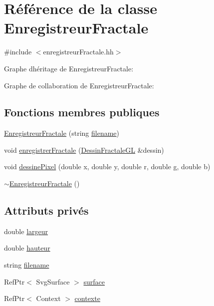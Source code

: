 \hypertarget{classEnregistreurFractale}{}\section{Référence de la classe Enregistreur\+Fractale}
\label{classEnregistreurFractale}


{\ttfamily \#include $<$enregistreur\+Fractale.\+hh$>$}



Graphe d\textquotesingle{}héritage de Enregistreur\+Fractale\+:


Graphe de collaboration de Enregistreur\+Fractale\+:
\subsection*{Fonctions membres publiques}
\begin{DoxyCompactItemize}
\item 
\hyperlink{classEnregistreurFractale_a41e2b5d991a102bf7af1491b986ab8fb}{Enregistreur\+Fractale} (string \hyperlink{classEnregistreurFractale_a31b4ca6d0309700e2e6c26087a76d855}{filename})
\item 
void \hyperlink{classEnregistreurFractale_aa6ad605b775a79d8ea96a5bc8008070a}{enregistrer\+Fractale} (\hyperlink{classDessinFractaleGL}{Dessin\+Fractale\+GL} \&dessin)
\item 
void \hyperlink{classEnregistreurFractale_a594fe98fad6fe07acee198fb5de013ab}{dessine\+Pixel} (double x, double y, double r, double g, double b)
\item 
\hyperlink{classEnregistreurFractale_a5cb00738a4526c7bf1c93a84077cdb42}{$\sim$\+Enregistreur\+Fractale} ()
\end{DoxyCompactItemize}
\subsection*{Attributs privés}
\begin{DoxyCompactItemize}
\item 
double \hyperlink{classEnregistreurFractale_abbaf005fa703ee05a79abca7006f3a5e}{largeur}
\item 
double \hyperlink{classEnregistreurFractale_aa7b368324a887410f6133edfd370fe5c}{hauteur}
\item 
string \hyperlink{classEnregistreurFractale_a31b4ca6d0309700e2e6c26087a76d855}{filename}
\item 
Ref\+Ptr$<$ Svg\+Surface $>$ \hyperlink{classEnregistreurFractale_a4c01839e709dd033364d996aa74bfc01}{surface}
\item 
Ref\+Ptr$<$ Context $>$ \hyperlink{classEnregistreurFractale_ad7af9f1a310fa61fca30232e655a08cb}{contexte}
\end{DoxyCompactItemize}


